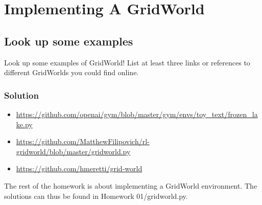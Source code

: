\documentclass{article}
\begin{document}
\section{Implementing A GridWorld}
\subsection{Look up some examples}
Look up some examples of GridWorld! List at least three links or references to
different GridWorlds you could find online.
\subsubsection{Solution}
\begin{itemize}
    \item \url{https://github.com/openai/gym/blob/master/gym/envs/toy_text/frozen_lake.py}
    \item \url{https://github.com/MatthewFilipovich/rl-gridworld/blob/master/gridworld.py}
    \item \url{https://github.com/hmeretti/grid-world}  
\end{itemize} \par

The rest of the homework is about implementing a GridWorld environment. The solutions can 
thus be found in Homework 01/gridworld.py.




\end{document}
